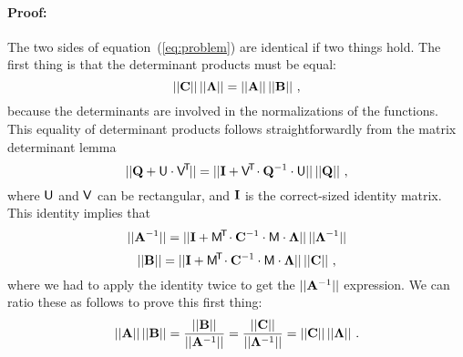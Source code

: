 \paragraph{Proof:}
The two sides of equation~(\ref{eq:problem}) are identical if two things hold.
The first thing is that the determinant products must be equal:
\begin{equation}
||\mathbf{C}||\,||\mathbf{\Lambda}|| = ||\mathbf{A}||\,||\mathbf{B}||
~ ,
\end{equation}
because the determinants are involved in the normalizations of the
functions.
This equality of determinant products follows straightforwardly from
the matrix determinant lemma
\begin{equation}\label{eq:detlemma}
||\mathbf{Q} + \mathsf{U}\cdot\mathsf{V}^{\!\mathsf{T}\!}|| = ||\mathbf{I} + \mathsf{V}^{\!\mathsf{T}\!}\cdot\mathbf{Q}^{-1}\cdot\mathsf{U}||\,||\mathbf{Q}||
~ ,
\end{equation}
where $\mathsf{U}$ and $\mathsf{V}$ can be rectangular, and $\mathbf{I}$ is the correct-sized identity matrix.
This identity implies that
\begin{equation}
||\mathbf{A}^{-1}|| = ||\mathbf{I} + \mathsf{M}^{\!\mathsf{T}\!}\cdot\mathbf{C}^{-1}\cdot\mathsf{M}\cdot\mathbf{\Lambda}||\,||\mathbf{\Lambda}^{-1}||
\end{equation}
\begin{equation}
||\mathbf{B}||     = ||\mathbf{I} + \mathsf{M}^{\!\mathsf{T}\!}\cdot\mathbf{C}^{-1}\cdot\mathsf{M}\cdot\mathbf{\Lambda}||\,||\mathbf{C}||
~,
\end{equation}
where we had to apply the identity twice to get the $||\mathbf{A}^{-1}||$ expression.
We can ratio these as follows to prove this first thing:
\begin{equation}
||\mathbf{A}||\,||\mathbf{B}||
 = \frac{||\mathbf{B}||}{||\mathbf{A}^{-1}||}
 = \frac{||\mathbf{C}||}{||\mathbf{\Lambda}^{-1}||}
 = ||\mathbf{C}||\,||\mathbf{\Lambda}||
~ .
\end{equation}

